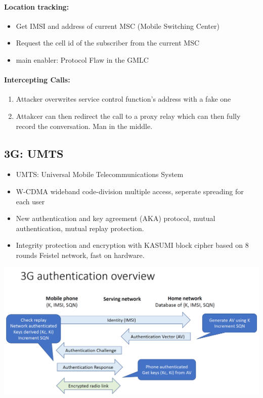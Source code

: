 \paragraph{Location tracking:}
\begin{itemize}
    \item Get IMSI and address of current MSC (Mobile Switching Center)
    \item Request the cell id of the subscriber from the current MSC
    \item main enabler: Protocol Flaw in the GMLC
\end{itemize}

\paragraph{Intercepting Calls:}
\begin{enumerate}
    \item Attacker overwrites service control function's address with a fake one
    \item Attakcer can then redirect the call to a proxy relay which can then fully record the conversation. Man in the middle.
\end{enumerate} 

\subsection{3G: UMTS}
\begin{itemize}
    \item UMTS: Universal Mobile Telecommunications System
    \item W-CDMA wideband code-division multiple access, seperate spreading for each user
    \item New authentication and key agreement (AKA) protocol, mutual authentication, mutual replay protection.
    \item Integrity protection and encryption with KASUMI block cipher based on 8 rounds Feistel network, fast on hardware.
\end{itemize}

\begin{minipage}{\linewidth}
    \centering      
    \includegraphics[width=\linewidth]{Figures/L10_3g_auth.PNG}
\end{minipage}

